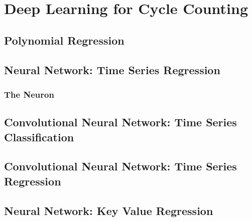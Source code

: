 \section{Deep Learning for Cycle Counting}

\subsection{Polynomial Regression}

\subsection{Neural Network: Time Series Regression}

\subsubsection{The Neuron}

\subsection{Convolutional Neural Network: Time Series Classification}

\subsection{Convolutional Neural Network: Time Series Regression}

\subsection{Neural Network: Key Value Regression}